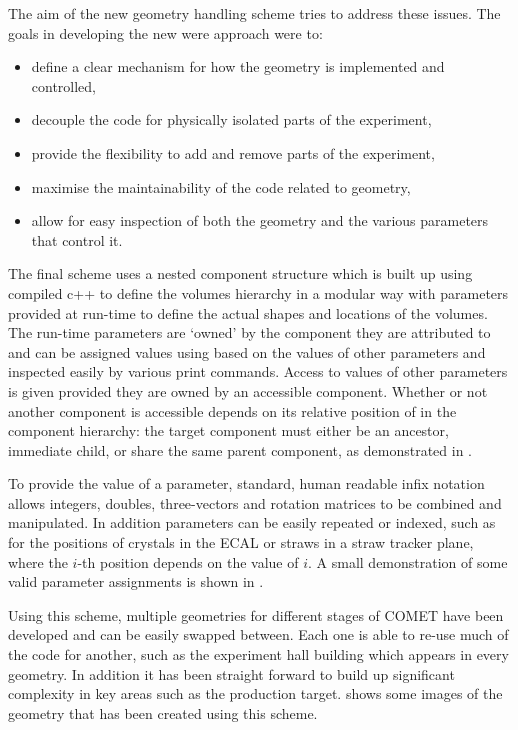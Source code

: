 The aim of the new geometry handling scheme tries to address these issues.
The goals in developing the new were approach were to:
\begin{itemize}
\setlength{\itemsep}{-1ex}
\item define a clear mechanism for how the geometry is implemented and controlled,
\item decouple the code for physically isolated parts of the experiment,
\item provide the flexibility to add and remove parts of the experiment,
\item maximise the maintainability of the code related to geometry,
\item allow for easy inspection of both the geometry and the various parameters that control it.
\end{itemize}

\FigGeometryHeirarchy

The final scheme uses a nested component structure which is built up using compiled c++ to define the volumes hierarchy in a modular way with parameters provided at run-time to define the actual shapes and locations of the volumes.
The run-time parameters are `owned' by the component they are attributed to and can be assigned values using based on the values of other parameters and inspected easily by various print commands.
Access to values of other parameters is given provided they are owned by an accessible component.
Whether or not another component is accessible depends on its relative position of in the component hierarchy: the target component must either be an ancestor, immediate child, or share the same parent component, as demonstrated in .

To provide the value of a parameter, standard, human readable infix notation allows integers, doubles, three-vectors and rotation matrices to be combined and manipulated.
In addition parameters can be easily repeated or indexed, such as for the positions of crystals in the ECAL or straws in a straw tracker plane, where the $i$-th position depends on the value of $i$.
A small demonstration of some valid parameter assignments is shown in .

\FigGeometryParameters{}

Using this scheme, multiple geometries for different stages of COMET have been developed and can be easily swapped between.
Each one is able to re-use much of the code for another, such as the experiment hall building which appears in every geometry.
In addition it has been straight forward to build up significant complexity in key areas such as the production target.
 shows some images of the geometry that has been created using this scheme.

